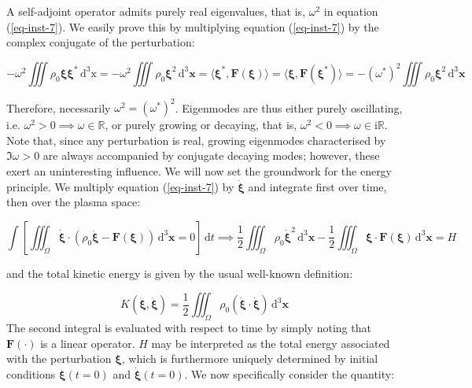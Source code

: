 A self-adjoint operator admits purely real eigenvalues, that is, $\omega^2$ in equation (\ref{eq-inst-7}). We easily prove this by multiplying equation (\ref{eq-inst-7}) by the complex conjugate of the perturbation:

\begin{equation}
    -\omega^2\iiint\rho_0\boldsymbol{\xi}\boldsymbol{\xi}^*\,\mathrm{d}^3\mathrm{x}=-\omega^2\iiint\rho_0\boldsymbol{\xi}^2\,\mathrm{d}^3\mathbf{x}=\langle\boldsymbol{\xi}^*,\mathbf{F}(\boldsymbol{\xi})\rangle=\langle\boldsymbol{\xi},\mathbf{F}(\boldsymbol{\xi}^*)\rangle=-(\omega^*)^2\iiint\rho_0\boldsymbol{\xi}^2\,\mathrm{d}^3\mathbf{x}
\end{equation}

Therefore, necessarily $\omega^2=(\omega^*)^2$. Eigenmodes are thus either purely oscillating, i.e. $\omega^2>0\implies\omega\in\mathbb{R}$, or purely growing or decaying, that is, $\omega^2<0\implies\omega\in\mathrm{i}\mathbb{R}$. Note that, since any perturbation is real, growing eigenmodes characterised by $\Im\omega>0$ are always accompanied by conjugate decaying modes; however, these exert an uninteresting influence. We will now set the groundwork for the energy principle. We multiply equation (\ref{eq-inst-7}) by $\dot{\boldsymbol{\xi}}$ and integrate first over time, then over the plasma space:

\begin{equation}
    \int\left[\iiint_\Omega\dot{\boldsymbol{\xi}}\cdot(\rho_0\ddot{\boldsymbol{\xi}}-\mathbf{F}(\boldsymbol{\xi}))\,\mathrm{d}^3\mathbf{x}=0\right]\,\mathrm{d}t\implies\frac{1}{2}\iiint_\Omega\rho_0\dot{\boldsymbol{\xi}}^2\,\mathrm{d}^3\mathbf{x}-\frac{1}{2}\iiint_\Omega\boldsymbol{\xi}\cdot\mathbf{F}(\boldsymbol{\xi})\,\mathrm{d}^3\mathbf{x}=H
\end{equation}

and the total kinetic energy is given by the usual well-known definition:

\begin{equation}
    K(\dot{\boldsymbol{\xi}},\dot{\boldsymbol{\xi}})=\frac{1}{2}\iiint_\Omega\rho_0(\dot{\boldsymbol{\xi}}\cdot\dot{\boldsymbol{\xi}})\,\mathrm{d}^3\mathbf{x}
\end{equation}The second integral is evaluated with respect to time by simply noting that $\mathbf{F}(\cdot)$ is a linear operator. $H$ may be interpreted as the total energy associated with the perturbation $\boldsymbol{\xi}$, which is furthermore uniquely determined by initial conditions $\boldsymbol{\xi}(t=0)$ and $\dot{\boldsymbol{\xi}}(t=0)$. We now specifically consider the quantity:

